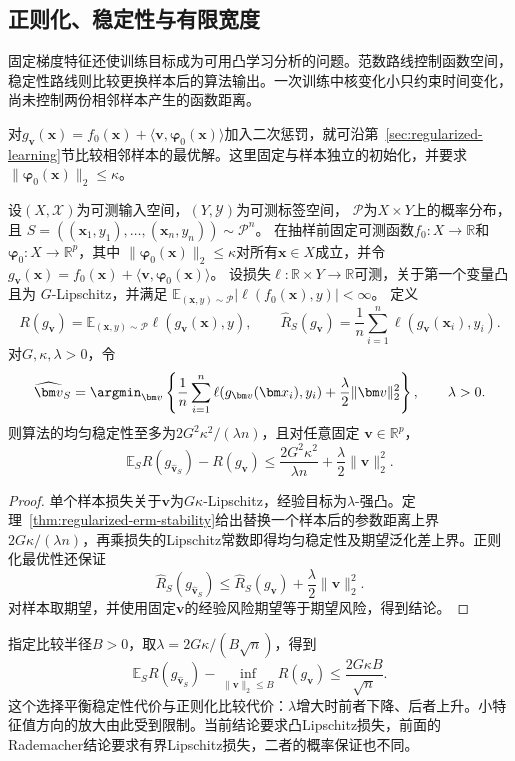 \subsection{正则化、稳定性与有限宽度}

固定梯度特征还使训练目标成为可用凸学习分析的问题。范数路线控制函数空间，稳定性路线则比较更换样本后的算法输出。一次训练中核变化小只约束时间变化，尚未控制两份相邻样本产生的函数距离。

对$g_{\bm v}(\bm x)=f_0(\bm x)+\langle\bm v,\bm\varphi_0(\bm x)\rangle$加入二次惩罚，就可沿第~\ref{sec:regularized-learning}节比较相邻样本的最优解。这里固定与样本独立的初始化，并要求$\|\bm\varphi_0(\bm x)\|_2\leq\kappa$。

\begin{theorem}[正则化固定特征模型的稳定性]
\label{thm:ntk-stability-risk}
设$(X,\mathcal X)$为可测输入空间，$(Y,\mathcal Y)$为可测标签空间，
$\mathcal P$为$X\times Y$上的概率分布，且
$S=((\bm x_1,y_1),\ldots,(\bm x_n,y_n))\sim\mathcal P^n$。
在抽样前固定可测函数$f_0:X\to\mathbb R$和
$\bm\varphi_0:X\to\mathbb R^p$，其中
$\|\bm\varphi_0(\bm x)\|_2\leq\kappa$对所有$\bm x\in X$成立，并令
$g_{\bm v}(\bm x)=f_0(\bm x)+\langle\bm v,\bm\varphi_0(\bm x)\rangle$。
设损失$\ell:\mathbb R\times Y\to\mathbb R$可测，关于第一个变量凸且为
$G$-Lipschitz，并满足
$\mathbb E_{(\bm x,y)\sim\mathcal P}|\ell(f_0(\bm x),y)|<\infty$。
定义
\[
 R(g_{\bm v})=\mathbb E_{(\bm x,y)\sim\mathcal P}
                    \ell(g_{\bm v}(\bm x),y),\qquad
 \hat R_S(g_{\bm v})=\frac1n\sum_{i=1}^n
                    \ell(g_{\bm v}(\bm x_i),y_i).
\]
对$G,\kappa,\lambda>0$，令
\[
 \widehat{\bm v}_S=\argmin_{\bm v}
 \left\{\frac1n\sum_{i=1}^n\ell(g_{\bm v}(\bm x_i),y_i)
       +\frac\lambda2\|\bm v\|_2^2\right\},\qquad\lambda>0.
\]
则算法的均匀稳定性至多为$2G^2\kappa^2/(\lambda n)$，且对任意固定
$\bm v\in\mathbb R^p$，
\[
 \mathbb E_S R(g_{\widehat{\bm v}_S})-R(g_{\bm v})
 \leq\frac{2G^2\kappa^2}{\lambda n}+\frac\lambda2\|\bm v\|_2^2.
\]
\end{theorem}
\begin{proof}
单个样本损失关于$\bm v$为$G\kappa$-Lipschitz，经验目标为$\lambda$-强凸。定理~\ref{thm:regularized-erm-stability}给出替换一个样本后的参数距离上界$2G\kappa/(\lambda n)$，再乘损失的Lipschitz常数即得均匀稳定性及期望泛化差上界。正则化最优性还保证
\[
 \hat R_S(g_{\widehat{\bm v}_S})
 \leq\hat R_S(g_{\bm v})+\frac\lambda2\|\bm v\|_2^2.
\]
对样本取期望，并使用固定$\bm v$的经验风险期望等于期望风险，得到结论。
\end{proof}

指定比较半径$B>0$，取$\lambda=2G\kappa/(B\sqrt n)$，得到
\begin{equation}
 \mathbb E_S R(g_{\widehat{\bm v}_S})
 -\inf_{\|\bm v\|_2\leq B}R(g_{\bm v})
 \leq\frac{2G\kappa B}{\sqrt n}.
 \label{eq:ntk-sample-risk}
\end{equation}
这个选择平衡稳定性代价与正则化比较代价：$\lambda$增大时前者下降、后者上升。小特征值方向的放大由此受到限制。当前结论要求凸Lipschitz损失，前面的Rademacher结论要求有界Lipschitz损失，二者的概率保证也不同。

